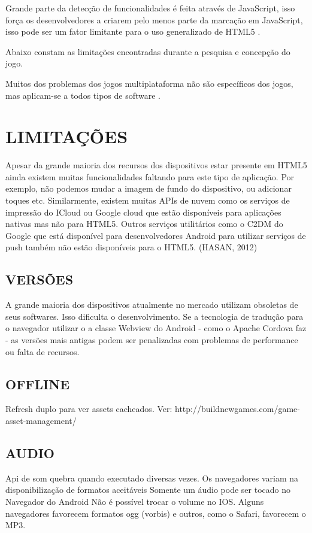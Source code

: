 Grande parte da detecção de funcionalidades é feita através de JavaScript, isso força os desenvolvedores a criarem pelo menos parte da marcação em JavaScript, isso pode ser um fator limitante para o uso generalizado de HTML5 \autocite{diveIntohtml}.

Abaixo constam as limitações encontradas durante a pesquisa e concepção do jogo.

Muitos dos problemas dos jogos multiplataforma não são específicos
dos jogos, mas aplicam-se a todos tipos de software  \parencite{currentStateCrossPlatform}.

\section{LIMITAÇÕES}

Apesar da grande maioria dos recursos dos dispositivos estar presente
em HTML5 ainda existem muitas funcionalidades faltando para este tipo
de aplicação. Por exemplo, não podemos mudar a imagem de fundo do
dispositivo, ou adicionar toques etc. Similarmente, existem muitas
APIs de nuvem como os serviços de impressão do ICloud ou Google
cloud que estão disponíveis para aplicações nativas mas não para
HTML5. Outros serviços utilitários como o C2DM do Google que está
disponível para desenvolvedores Android para utilizar serviços de push
também não estão disponíveis para o HTML5. (HASAN, 2012)

\subsection{VERSÕES}
A grande maioria dos dispositivos atualmente no mercado utilizam
obsoletas de seus softwares. Isso dificulta o desenvolvimento. Se a
tecnologia de tradução para o navegador utilizar o a classe Webview do
Android - como o Apache Cordova faz - as versões mais antigas podem ser
penalizadas com problemas de performance ou falta de recursos.

\subsection{OFFLINE}

Refresh duplo para ver assets cacheados. Ver:
http://buildnewgames.com/game-asset-management/

\subsection{AUDIO}
Api de som quebra quando executado diversas vezes.
Os navegadores variam na disponibilização de formatos aceitáveis
Somente um áudio pode ser tocado no Navegador do Android
Não é possível trocar o volume no IOS.
Alguns navegadores favorecem formatos ogg (vorbis) e outros, como o
Safari, favorecem o MP3.

